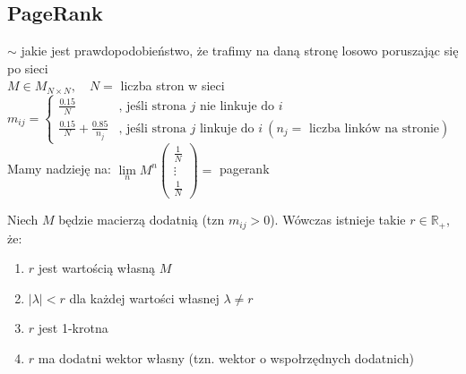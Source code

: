 \documentclass[10pt]{article}
\theoremstyle{definition}
\theoremstyle{definition}
\theoremstyle{definition}
\theoremstyle{definition}
\theoremstyle{remark}
\theoremstyle{definition}
\theoremstyle{definition}
\theoremstyle{definition}
\theoremstyle{definition}
\theoremstyle{definition}
\begin{document}
\subsection{PageRank}
$\sim$ jakie jest prawdopodobieństwo, że trafimy na daną stronę losowo poruszając się po sieci\\ 
$M \in M_{N \times N}, \quad N=$ liczba stron w sieci \\ 
$m_{ij} = \begin{cases} \frac{0.15}{N} & \text{, jeśli strona } j \text{ nie linkuje do } i \\ 
\frac{0.15}{N} + \frac{0.85}{n_j} & \text{, jeśli strona } j \text{ linkuje do } i \ (n_j=\text{ liczba linków na stronie}) \end{cases}$ \\ 
Mamy nadzieję na: 
$ \lim\limits_n M^n \begin{pmatrix} \frac{1}{N} \\ \vdots \\ \frac{1}{N} \end{pmatrix} = $ pagerank
\begin{tw}
    Niech $M$ będzie macierzą dodatnią (tzn $m_{ij} > 0$). Wówczas istnieje takie $r \in \mathbb R_+$, że:
    \begin{enumerate}[(1)]
        \item $r$ jest wartością własną $M$
        \item $ |\lambda| < r$ dla każdej wartości własnej $\lambda \neq r$ 
        \item $r$ jest 1-krotna 
        \item $r$ ma dodatni wektor własny (tzn. wektor o wspołrzędnych dodatnich)
    \end{enumerate} 
\end{tw} 
\end{document}
